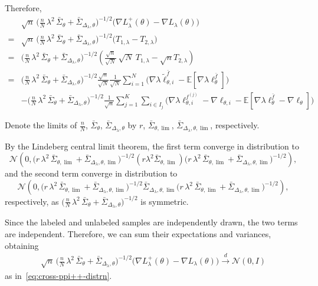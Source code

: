 \noindent
Therefore, \begin{align*}
    &\sqrt{n}\,
\Big( \tfrac{n}{N}\,\lambda^2\,\bar{\Sigma}_\theta + \bar{\Sigma}_{\Delta_\lambda,\theta} \Big)^{-1/2}
\big( \nabla L_\lambda^+(\theta) - \nabla L_\lambda(\theta) \big)\\ 
=&
\sqrt{n}\,
\Big( \tfrac{n}{N}\,\lambda^2\,\bar{\Sigma}_\theta + \bar{\Sigma}_{\Delta_\lambda,\theta} \Big)^{-1/2}
\big( T_{1,\lambda} - T_{2,\lambda} \big)\\
=&\Big( \tfrac{n}{N}\,\lambda^2\,\bar{\Sigma}_\theta + \bar{\Sigma}_{\Delta_\lambda,\theta} \Big)^{-1/2}
\left(\frac{\sqrt{n}}{\sqrt{N}}\ \sqrt{N}\  T_{1,\lambda} - \sqrt{n}T_{2,\lambda} \right)\\
=&\Big( \tfrac{n}{N}\,\lambda^2\,\bar{\Sigma}_\theta + \bar{\Sigma}_{\Delta_\lambda,\theta} \Big)^{-1/2}\frac{\sqrt{n}}{\sqrt{N}}\frac{1}{\sqrt{N}} \sum_{i=1}^N
\big( \nabla \lambda \tilde{\ell}_{\theta,i}^{\bar f}
- \mathbb{E}[\nabla \lambda \ell^{\bar f}_\theta] \big)\\
&-\Big( \tfrac{n}{N}\,\lambda^2\,\bar{\Sigma}_\theta + \bar{\Sigma}_{\Delta_\lambda,\theta} \Big)^{-1/2}\frac{1}{\sqrt{n}} \sum_{j=1}^K \sum_{i \in I_j}\Big( \nabla \lambda \ell^{f^{(j)}}_{\theta,i} - \nabla \ell_{\theta,i}
  - \mathbb{E}[\nabla \lambda \ell^{\bar f}_\theta - \nabla \ell_\theta] \Big)
\end{align*}

Denote the limits of $\frac{n}{N}$, $\bar\Sigma_\theta$, $\bar\Sigma_{\Delta_\lambda,\theta}$ by $r$, $\bar\Sigma_{\theta,\lim}$, $\bar\Sigma_{\Delta_\lambda,\theta,\lim}$, respectively.

By the Lindeberg central limit theorem, the first term converge in distribution to\[
    \mathcal{N}\left(0,
    \Big( r\,\lambda^2\,\bar{\Sigma}_{\theta,\lim} + \bar{\Sigma}_{\Delta_\lambda,\theta,\lim} \Big)^{-1/2}
    \left(r\lambda^2\bar{\Sigma}_{\theta,\lim}\right)
    \Big( r\,\lambda^2\,\bar{\Sigma}_{\theta,\lim} + \bar{\Sigma}_{\Delta_\lambda,\theta,\lim} \Big)^{-1/2}
    \right),
\]and the second term converge in distribution to\[
    \mathcal{N}\left(0,
    \Big( r\,\lambda^2\,\bar{\Sigma}_{\theta,\lim} + \bar{\Sigma}_{\Delta_\lambda,\theta,\lim} \Big)^{-1/2}
    \bar{\Sigma}_{\Delta_\lambda,\theta,\lim} 
    \Big( r\,\lambda^2\,\bar{\Sigma}_{\theta,\lim} + \bar{\Sigma}_{\Delta_\lambda,\theta,\lim} \Big)^{-1/2}
    \right),
\]respectively, as $\Big( \tfrac{n}{N}\,\lambda^2\,\bar{\Sigma}_\theta + \bar{\Sigma}_{\Delta_\lambda,\theta} \Big)^{-1/2}$ is symmetric.

\noindent
Since the labeled and unlabeled samples are independently drawn, the two terms are independent. Therefore, we can sum their expectations and variances, obtaining\begin{align*}
    \sqrt{n}\,
\Big( \tfrac{n}{N}\,\lambda^2\,\bar{\Sigma}_\theta + \bar{\Sigma}_{\Delta_\lambda,\theta} \Big)^{-1/2}
\big( \nabla L_\lambda^+(\theta) - \nabla L_\lambda(\theta) \big)\overset{d}{\longrightarrow}\mathcal{N}(0,I)
\end{align*}as in~\eqref{eq:cross-ppi++-distrn}.


